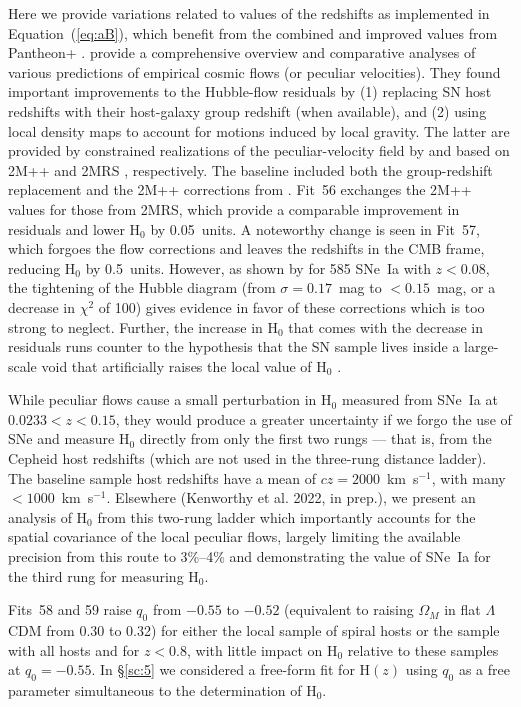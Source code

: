 \documentclass[12pt]{aastex631}
\begin{document}
Here we provide variations related to values of the redshifts as implemented in Equation~(\ref{eq:aB}), which benefit from the combined and improved values from Pantheon+ \citep{Carr:2021}. \citet{Peterson:2021} provide a comprehensive overview and comparative analyses of various predictions of empirical cosmic flows (or peculiar velocities).  They found important improvements to the Hubble-flow residuals by (1) replacing SN host redshifts with their host-galaxy group redshift (when available), and (2) using local density maps to account for motions induced by local gravity. The latter are provided by constrained realizations of the peculiar-velocity field by \citet{Carrick:2015} and  \citet{Lilow:2021} based on 2M++ \citep{Lavaux:2011} and 2MRS \citep{Huchra:2012,Macri:2019}, respectively.  The baseline included both the group-redshift replacement and the 2M++ corrections from \citet{Peterson:2021}.  Fit~56 exchanges the 2M++ values for those from 2MRS, which provide a comparable improvement in residuals and lower H$_0$ by 0.05~units.  A noteworthy change is seen in Fit~57, which forgoes the flow corrections and leaves the redshifts in the CMB frame, reducing H$_0$ by 0.5~units.  However, as shown by \citet{Peterson:2021} for 585 SNe~Ia with $z<0.08$, the tightening of the Hubble diagram (from $\sigma=0.17$~mag to $< 0.15$~mag, or a decrease in $\chi^2$ of 100) gives evidence in favor of these corrections which is too strong to neglect.   Further, the increase in H$_0$ that comes with the decrease in residuals runs counter to the hypothesis that the SN sample lives inside a large-scale void that artificially raises the local value of H$_0$ \citep{Kenworthy:2019}.

While peculiar flows cause a small perturbation in H$_0$ measured from SNe~Ia at $0.0233<z<0.15$, they would produce a greater uncertainty if we forgo the use of SNe and measure H$_0$ directly from only the first two rungs --- that is, from the Cepheid host redshifts (which are not used in the three-rung distance ladder).  The baseline sample host redshifts have a mean of $cz=2000$~km~s$^{-1}$, with many $< 1000$~km~s$^{-1}$. Elsewhere (Kenworthy et al. 2022, in prep.), we present an analysis of H$_0$ from this two-rung ladder which importantly accounts for the spatial covariance of the local peculiar flows, largely limiting the available precision from this route to 3\%--4\% and demonstrating the value of SNe~Ia for the third rung for measuring H$_0$.

Fits~58 and 59 raise $q_0$ from $-0.55$ to $-0.52$ (equivalent to raising $\Omega_M$ in flat $\Lambda$CDM from 0.30 to 0.32) for either the local sample of spiral hosts or the sample with all hosts and for $z<0.8$, with little impact on H$_0$ relative to these samples at $q_0=-0.55$.  In \S\ref{sc:5} we considered a free-form fit for H$(z)$ using $q_0$ as a free parameter simultaneous to the determination of H$_0$.  
\end{document}
